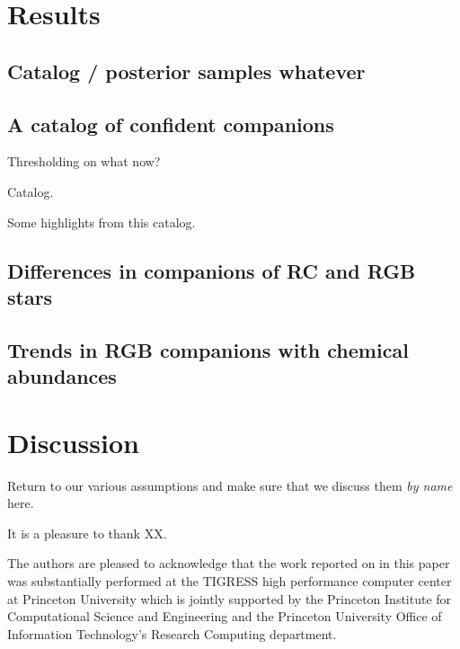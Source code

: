 \documentclass[modern, letterpaper]{aastex61}
\begin{document}
\section{Results}

\subsection{Catalog / posterior samples whatever} \label{sec:full-catalog}


\subsection{A catalog of confident companions} \label{sec:conf-companions}


Thresholding on what now?

Catalog.

Some highlights from this catalog.

\subsection{Differences in companions of RC and RGB stars}
\label{sec:rc-rgb}


\subsection{Trends in RGB companions with chemical abundances}
\label{sec:rgb-chemistry}


\section{Discussion}

Return to our various assumptions and make sure that we discuss them
\emph{by name} here.

\acknowledgements

It is a pleasure to thank XX.

The authors are pleased to acknowledge that the work reported on in this
paper was substantially performed at the TIGRESS high performance computer
center at Princeton University which is jointly supported by the Princeton
Institute for Computational Science and Engineering and the Princeton
University Office of Information Technology's Research Computing department.
\end{document}
